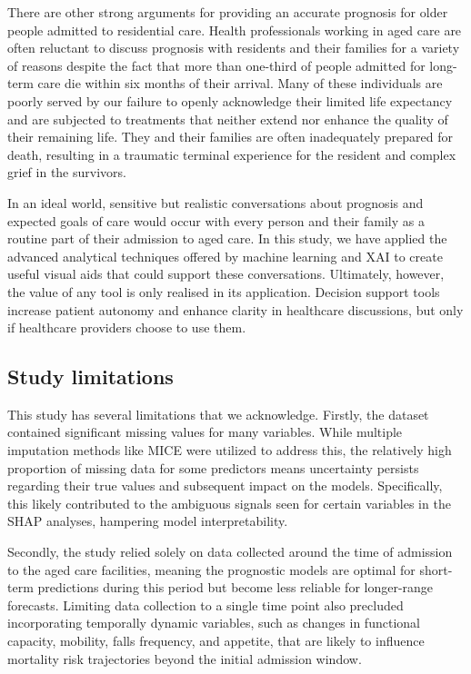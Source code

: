 \documentclass{article}
\begin{document}
There are other strong arguments for providing an accurate prognosis for older people admitted to residential care. Health professionals working in aged care are often reluctant to discuss prognosis with residents and their families for a variety of reasons despite the fact that more than one-third of people admitted for long-term care die within six months of their arrival. Many of these individuals are poorly served by our failure to openly acknowledge their limited life expectancy and are subjected to treatments that neither extend nor enhance the quality of their remaining life. They and their families are often inadequately prepared for death, resulting in a traumatic terminal experience for the resident and complex grief in the survivors.

In an ideal world, sensitive but realistic conversations about prognosis and expected goals of care would occur with every person and their family as a routine part of their admission to aged care. In this study, we have applied the advanced analytical techniques offered by machine learning and XAI to create useful visual aids that could support these conversations.   Ultimately, however,  the value of any tool is only realised in its application.  Decision support tools increase patient autonomy and enhance clarity in healthcare discussions,  but only if healthcare providers choose to use them.



\subsection{Study limitations}

This study has several limitations that we acknowledge.  Firstly, the dataset contained significant missing values for many variables. While multiple imputation methods like MICE were utilized to address this, the relatively high proportion of missing data for some predictors means uncertainty persists regarding their true values and subsequent impact on the models. Specifically, this likely contributed to the ambiguous signals seen for certain variables in the SHAP analyses, hampering model interpretability.

Secondly, the study relied solely on data collected around the time of admission to the aged care facilities, meaning the prognostic models are optimal for short-term predictions during this period but become less reliable for longer-range forecasts.  Limiting data collection to a single time point also precluded incorporating temporally dynamic variables, such as changes in functional capacity, mobility, falls frequency, and appetite, that are likely to influence mortality risk trajectories beyond the initial admission window.
\end{document}
